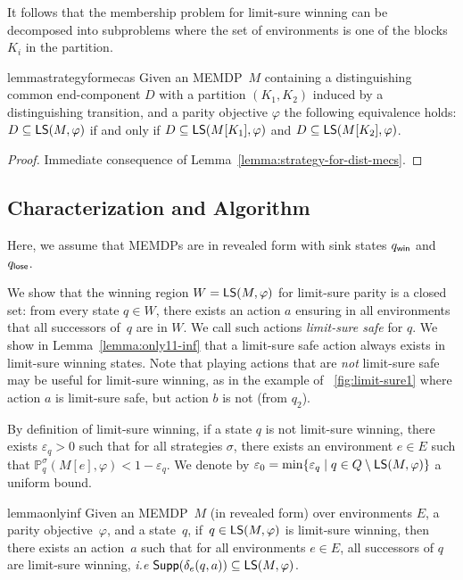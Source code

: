 \documentclass[a4paper,USenglish,cleveref, autoref, thm-restate]{lipics-v2021}
\let\epsilon\varepsilon
\newcommand*{\pr}{\mathbb{P}}
\newcommand\Supp{\textrm{\sf Supp}}
\newcommand\limitsure{\textrm{\sf LS}}
\def\loseabsorb{q_{\sf lose}}
\def\winabsorb{q_{\sf win}}
\begin{document}
It follows that the membership problem for limit-sure winning can be decomposed into subproblems where the set of environments is one of the blocks $K_i$ in the partition.

\begin{restatable}{lemma}{strategyformecas}
  \label{lemma:strategy-for-mec-as}
  Given an MEMDP~$M$ containing a distinguishing common end-component $D$ with a partition $(K_1,K_2)$
  induced by a distinguishing transition, and a parity objective $\varphi$ the following equivalence holds:
  $D \subseteq \limitsure(M,\varphi)$ if and only if $D \subseteq \limitsure(M[K_1],\varphi)$ and 
  $D \subseteq \limitsure(M[K_2],\varphi)$. 
\end{restatable}


\begin{proof}
	Immediate consequence of Lemma~\ref{lemma:strategy-for-dist-mecs}.
\end{proof}


\subsection{Characterization and Algorithm}


Here, we assume that MEMDPs are in revealed form
with sink states $\winabsorb$ and $\loseabsorb$.

We show that the winning region $W = \limitsure(M,\varphi)$ 
for limit-sure parity is a closed set: from every state $q \in W$,
there exists an action $a$ ensuring in all environments
that all successors of~$q$ are in $W$.
We call such actions \emph{limit-sure safe} for $q$.
We show in Lemma~\ref{lemma:only11-inf} that a limit-sure safe action always exists in 
limit-sure winning states. 
Note that playing actions that are \emph{not} limit-sure safe may be useful 
for limit-sure winning, as in the example of \figurename~\ref{fig:limit-sure1} 
where action $a$ is limit-sure safe, but action $b$ is not (from $q_2$).


By definition of limit-sure winning, if a state $q$ is not limit-sure winning,
there exists $\epsilon_q > 0$ such that for all strategies $\sigma$, there
exists an environment $e \in E$ such that $\pr_{q}^{\sigma}(M[e], \varphi) < 1-\epsilon_q$.
We denote by $\epsilon_0 = \min \{\epsilon_q \mid q \in Q \setminus \limitsure(M,\varphi)\}$
a uniform bound.


\begin{restatable}{lemma}{onlyinf}
\label{lemma:only11-inf}
	Given an MEMDP~$M$ (in revealed form) over environments $E$, a parity objective~$\varphi$, and a state~$q$,
	if~$q \in \limitsure(M,\varphi)$ is limit-sure winning, then there exists an action~$a$ such that
	for all environments $e\in E$, all successors of $q$ are limit-sure winning, 
	\textit{i.e} $\Supp(\delta_e(q,a))\subseteq \limitsure(M,\varphi)$.
\end{restatable}
\end{document}
